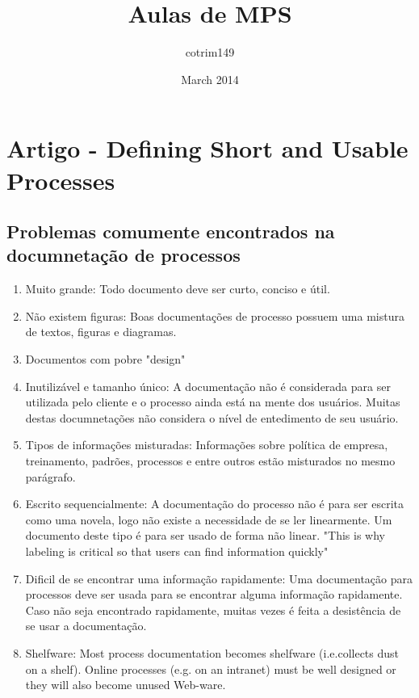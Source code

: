 \documentclass{article}
\title{Aulas de MPS}
\author{cotrim149 }
\date{March 2014}
\begin{document}
\maketitle

\section{Artigo - Defining Short and Usable Processes}

\subsection{Problemas comumente encontrados na documnetação de processos}

\begin{enumerate}
	\item Muito grande: Todo documento deve ser curto, conciso e útil.
	\item Não existem figuras: Boas documentações de processo possuem uma mistura de textos, figuras e diagramas. 
	\item Documentos com pobre "design"
	\item Inutilizável e tamanho único: A documentação não é considerada para ser utilizada pelo cliente e o processo ainda está na mente dos usuários. Muitas destas documnetações não considera o nível de entedimento de seu usuário.
	\item Tipos de informações misturadas: Informações sobre política de empresa, treinamento, padrões, processos e entre outros estão misturados no mesmo parágrafo. 
	\item Escrito sequencialmente: A documentação do processo não é para ser escrita como uma novela, logo não existe a necessidade de se ler linearmente. Um documento deste tipo é para ser usado de forma não linear. "This is why labeling is critical so that users can find information quickly"
	\item Dificil de se encontrar uma informação rapidamente: Uma documentação para processos deve ser usada para se encontrar alguma informação rapidamente. Caso não seja encontrado rapidamente, muitas vezes é feita a desistência de se usar a documentação.
	\item  Shelfware: Most process documentation becomes shelfware (i.e.collects dust on a shelf). Online processes (e.g. on an intranet) must be well designed or they will also become unused Web-ware.
 
\end{enumerate}
\end{document}
